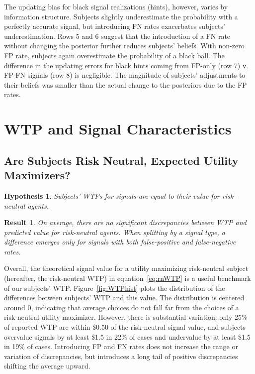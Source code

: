 \documentclass[12pt,a4paper]{article}
\newtheorem{hypothesis}{Hypothesis}
\newtheorem{result}{Result}
\begin{document}
The updating bias for black signal realizations (hints), however, varies by information structure. Subjects slightly underestimate the probability with a perfectly accurate signal, but introducing FN rates exacerbates subjects' underestimation. Rows 5 and 6 suggest that the introduction of a FN rate without changing the posterior further reduces subjects' beliefs. With non-zero FP rate, subjects again overestimate the probability of a black ball. The difference in the updating errors for black hints coming from FP-only (row 7) v. FP-FN signals (row 8) is negligible. 
The magnitude of subjects' adjustments to their beliefs was smaller than the actual change to the posteriors due to the FP rates.


\vspace{20pt}

\section{WTP and Signal Characteristics}\label{sec:results}

\subsection{Are Subjects Risk Neutral, Expected Utility Maximizers?} 

\begin{hypothesis}\label{hyp:eqRN} 
Subjects' WTPs for signals are equal to their value for risk-neutral agents. 
\end{hypothesis}

\begin{result} 
On average, there are no significant discrepancies between WTP and predicted value for risk-neutral agents. When splitting by a signal type, a difference emerges only for signals with both false-positive and false-negative rates.
\end{result}


Overall, the theoretical signal value for a utility maximizing risk-neutral subject (hereafter, the risk-neutral WTP) in equation~\ref{eq:rnWTP} is a useful benchmark of our subjects' WTP. Figure~\ref{fig:WTPhist} plots the distribution of the differences between subjects' WTP and this value.  
The distribution is centered around 0, indicating that average choices do not fall far from the choices of a risk-neutral utility maximizer. However, there is substantial variation: only 25\% of reported WTP are within \$0.50 of the risk-neutral signal value, and subjects overvalue signals by at least \$1.5 in 22\% of cases and undervalue by at least \$1.5 in 19\% of cases. Introducing FP and FN rates does not increase the range or variation of discrepancies, but introduces a long tail of positive discrepancies shifting the average upward.
\end{document}
